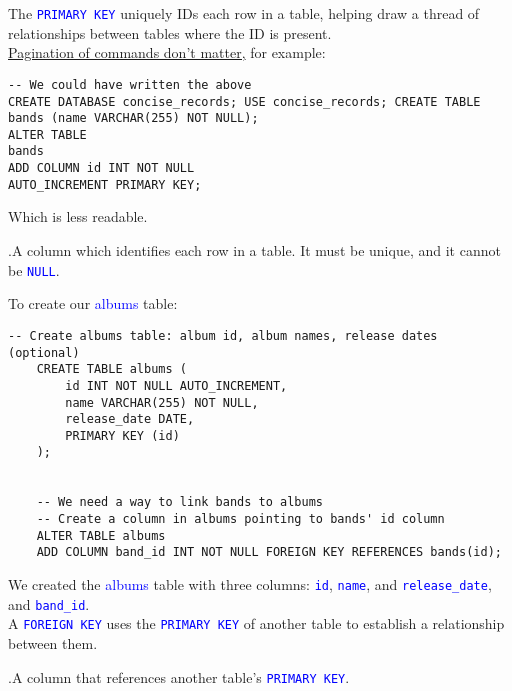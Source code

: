 \noindent
The \textcolor{blue}{\texttt{PRIMARY KEY}} uniquely IDs each row in a table, helping draw a thread of relationships between tables where the ID is present.\\

\noindent
\underline{Pagination of commands don't matter,} for example:
\begin {lstlisting}[style=sql]
-- We could have written the above
CREATE DATABASE concise_records; USE concise_records; CREATE TABLE bands (name VARCHAR(255) NOT NULL);
ALTER TABLE
bands
ADD COLUMN id INT NOT NULL
AUTO_INCREMENT PRIMARY KEY;
\end{lstlisting}

\noindent
Which is less readable.\\

\newpage

\noindent
\begin{Def}
    .A column which identifies each row in a table. It must be unique, and it cannot be \textcolor{blue}{\texttt{NULL}}.
\end{Def}

\noindent
To create our \textcolor{blue}{albums} table:

\begin{lstlisting}[style=sql]
    -- Create albums table: album id, album names, release dates (optional)
    CREATE TABLE albums (
        id INT NOT NULL AUTO_INCREMENT,
        name VARCHAR(255) NOT NULL,
        release_date DATE,
        PRIMARY KEY (id)
    );


    -- We need a way to link bands to albums
    -- Create a column in albums pointing to bands' id column
    ALTER TABLE albums
    ADD COLUMN band_id INT NOT NULL FOREIGN KEY REFERENCES bands(id);

\end{lstlisting}

\vspace{1em}
\noindent
We created the \textcolor{blue}{albums} table with three columns: \textcolor{blue}{\texttt{id}}, \textcolor{blue}{\texttt{name}}, and \textcolor{blue}{\texttt{release\_date}},
and \textcolor{blue}{\texttt{band\_id}}.\\ A \textcolor{blue}{\texttt{FOREIGN KEY}} uses the \textcolor{blue}{\texttt{PRIMARY KEY}} of another table to establish a relationship between them.\\

\begin{Def}
    .A column that references another table's \textcolor{blue}{\texttt{PRIMARY KEY}}.
\end{Def}


